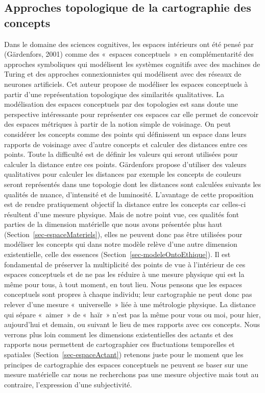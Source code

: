 \documentclass[
  a4paper,
  DIV=11,
  numbers=noendperiod]{scrreprt}
\begin{document}
\subsection{Approches topologique de la cartographie des
concepts}\label{sec-approcheTopologique}

Dans le domaine des sciences cognitives, les espaces intérieurs ont été
pensé par (Gärdenfors, 2001) comme des «~espaces conceptuels~» en
complémentarité des approches symboliques qui modélisent les systèmes
cognitifs avec des machines de Turing et des approches connexionnistes
qui modélisent avec des réseaux de neurones artificiels. Cet auteur
propose de modéliser les espaces conceptuels à partir d'une
représentation topologique des similarités qualitatives. La modélisation
des espaces conceptuels par des topologies est sans doute une
perspective intéressante pour représenter ces espaces car elle permet de
concevoir des espaces métriques à partir de la notion simple de
voisinage. On peut considérer les concepts comme des points qui
définissent un espace dans leurs rapports de voisinage avec d'autre
concepts et calculer des distances entre ces points. Toute la difficulté
est de définir les valeurs qui seront utilisées pour calculer la
distance entre ces points. Gärdenfors propose d'utiliser des valeurs
qualitatives pour calculer les distances par exemple les concepts de
couleurs seront représentés dans une topologie dont les distances sont
calculées suivants les qualités de nuance, d'intensité et de luminosité.
L'avantage de cette proposition est de rendre pratiquement objectif la
distance entre les concepts car celles-ci résultent d'une mesure
physique. Mais de notre point vue, ces qualités font parties de la
dimension matérielle que nous avons présentée plus haut
(Section~\ref{sec-espaceMateriels}), elles ne peuvent donc pas être
utilisées pour modéliser les concepts qui dans notre modèle relève d'une
autre dimension existentielle, celle des essences
(Section~\ref{sec-modeleOntoEthique}). Il est fondamental de préserver
la multiplicité des points de vue à l'intérieur de ces espaces
conceptuels et de ne pas les réduire à une mesure physique qui est la
même pour tous, à tout moment, en tout lieu. Nous pensons que les
espaces conceptuels sont propres à chaque individu; leur cartographie ne
peut donc pas relever d'une mesure «~universelle~» liée à une métrologie
physique. La distance qui sépare «~aimer~» de «~haïr~» n'est pas la même
pour vous ou moi, pour hier, aujourd'hui et demain, ou suivant le lieu
de mes rapports avec ces concepts. Nous verrons plus loin comment les
dimensions existentielles des actants et des rapports nous permettent de
cartographier ces fluctuations temporelles et spatiales
(Section~\ref{sec-espaceActant}) retenons juste pour le moment que les
principes de cartographie des espaces conceptuels ne peuvent se baser
sur une mesure matérielle car nous ne recherchons pas une mesure
objective mais tout au contraire, l'expression d'une subjectivité.
\end{document}
